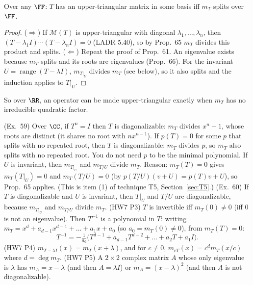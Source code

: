 \documentclass[10pt]{scrartcl}
\DeclareMathOperator{\range}{range}
\newcommand{\MM}{\mathcal M}
\begin{document}
\begin{proposition*}[LADR 5.44]
  Over any $\FF$: $T$ has an upper-triangular matrix in some basis iff $m_T$ splits over $\FF$.
\end{proposition*}
\begin{proof}
  ($\Rightarrow$) If $\MM(T)$ is upper-triangular with diagonal $\lambda_1,\dots,\lambda_n$, then $(T-\lambda_1I)\cdots(T-\lambda_nI)=0$ (LADR 5.40), so by Prop.~65 $m_T$ divides this product and splits. ($\Leftarrow$) Repeat the proof of Prop.~61. An eigenvalue exists because $m_T$ splits and its roots are eigenvalues (Prop.~66). For the invariant $U=\range(T-\lambda I)$, $m_{T|_U}$ divides $m_T$ (see below), so it also splits and the induction applies to $T|_U$.
\end{proof}
So over $\RR$, an operator can be made upper-triangular exactly when $m_T$ has no irreducible quadratic factor.

\begin{corollary*}
  \begin{enumerate}
    \ii (Ex.~59) Over $\CC$, if $T^n=I$ then $T$ is diagonalizable: $m_T$ divides $x^n-1$, whose roots are distinct (it shares no root with $nx^{n-1}$).
    \ii If $p(T)=0$ for some $p$ that splits with no repeated root, then $T$ is diagonalizable: $m_T$ divides $p$, so $m_T$ also splits with no repeated root. You do not need $p$ to be the minimal polynomial.
    \ii If $U$ is invariant, then $m_{T|_U}$ and $m_{T/U}$ divide $m_T$. Reason: $m_T(T)=0$ gives $m_T(T|_U)=0$ and $m_T(T/U)=0$ (by $p(T/U)(v+U)=p(T)v+U$), so Prop.~65 applies. (This is item (1) of technique T5, Section~\ref{sec:T5}.)
    \ii (Ex.~60) If $T$ is diagonalizable and $U$ is invariant, then $T|_U$ and $T/U$ are diagonalizable, because $m_{T|_U}$ and $m_{T/U}$ divide $m_T$.
    \ii (HW7 P3) $T$ is invertible iff $m_T(0)\ne0$ (iff $0$ is not an eigenvalue). Then $T^{-1}$ is a polynomial in $T$: writing $m_T=x^d+a_{d-1}x^{d-1}+\dots+a_1x+a_0$ (so $a_0=m_T(0)\ne0$), from $m_T(T)=0$:
    \[ T^{-1}=-\tfrac1{a_0}\big(T^{d-1}+a_{d-1}T^{d-2}+\dots+a_2T+a_1I\big). \]
    \ii (HW7 P4) $m_{T-\lambda I}(x)=m_T(x+\lambda)$, and for $c\ne0$, $m_{cT}(x)=c^dm_T(x/c)$ where $d=\deg m_T$.
    \ii (HW7 P5) A $2\times2$ complex matrix $A$ whose only eigenvalue is $\lambda$ has $m_A=x-\lambda$ (and then $A=\lambda I$) or $m_A=(x-\lambda)^2$ (and then $A$ is not diagonalizable).
  \end{enumerate}
\end{corollary*}
\end{document}
